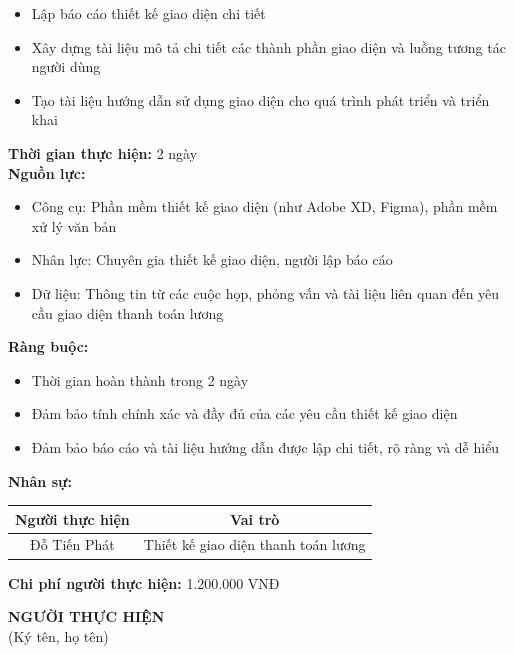 {\begin{minipage}{\textwidth}
\begin{itemize}
        \item Lập báo cáo thiết kế giao diện chi tiết
        \item Xây dựng tài liệu mô tả chi tiết các thành phần giao diện và luồng tương tác người dùng
        \item Tạo tài liệu hướng dẫn sử dụng giao diện cho quá trình phát triển và triển khai
    \end{itemize}
    \vspace{0.5cm}
    \noindent \textbf{Thời gian thực hiện:} 2 ngày \\
    \noindent \textbf{Nguồn lực:}
    \begin{itemize}
        \item Công cụ: Phần mềm thiết kế giao diện (như Adobe XD, Figma), phần mềm xử lý văn bản
        \item Nhân lực: Chuyên gia thiết kế giao diện, người lập báo cáo
        \item Dữ liệu: Thông tin từ các cuộc họp, phỏng vấn và tài liệu liên quan đến yêu cầu giao diện thanh toán lương
    \end{itemize}
    \vspace{0.5cm}
    \noindent \textbf{Ràng buộc:}
    \begin{itemize}
        \item Thời gian hoàn thành trong 2 ngày
        \item Đảm bảo tính chính xác và đầy đủ của các yêu cầu thiết kế giao diện
        \item Đảm bảo báo cáo và tài liệu hướng dẫn được lập chi tiết, rõ ràng và dễ hiểu
    \end{itemize}
    \vspace{0.5cm}
    \noindent \textbf{Nhân sự:}
    \begin{longtable}{|c|c|}
    \hline
    \textbf{Người thực hiện} & \textbf{Vai trò} \\
    \hline
    Đỗ Tiến Phát & Thiết kế giao diện thanh toán lương \\
    \hline
    \end{longtable}
    \vspace{0.5cm}
    \noindent \textbf{Chi phí người thực hiện:} 1.200.000 VNĐ
    \vspace{1cm}
    \begin{flushleft}
        \hspace{8cm} \textbf{NGƯỜI THỰC HIỆN} \\
        \hspace{8.8cm} (Ký tên, họ tên) \\
        \vspace{1cm}
    \end{flushleft}
    \end{minipage}
}
% 

